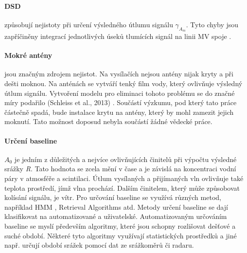 \documentclass[a4paper,12pt,oneside]{report}
\begin{document}
\paragraph*{DSD} způsobují nejistoty při určení výsledného útlumu
signálu \emph{$\gamma_{A_{m}} $}. Tyto chyby jsou zapříčiněny
integrací jednotlivých úseků tlumících signál na linii MV
spoje \cite{mv1}.

\paragraph*{Mokré antény}jsou značným zdrojem nejistot. Na vysílačích
nejsou antény nijak kryty a při dešti moknou. Na anténách se vytváří
tenký film vody, který ovlivňuje výsledný útlum signálu. Vytvoření
modelu pro eliminaci tohoto problému se do značné míry podařilo
(Schleiss et al., 2013) \cite{wetat}. Součástí výzkumu, pod který tato
práce částečně spadá, bude instalace krytu na antény, který by mohl
zamezit jejich moknutí. Tato možnost doposud nebyla součástí žádné
vědecké práce.

\paragraph*{Určení baseline } \emph{$A_{0}$} je jedním z důležitých
a nejvíce ovlivňujících činitelů při výpočtu výsledné srážky
\emph{R}. Tato hodnota se zcela mění v čase a je závislá na
koncentraci vodní páry v atmosféře a scintilaci. Útlum vysílaných a
přijímaných vln ovlivňuje také teplota prostředí, jímž vlna
prochází. Dalším činitelem, který může způsobovat kolísání signálu, je
vítr.  Pro určování baseline se využívá různých metod, například
   \acs{HMM} \cite{comparsinmv}, Retrieval Algorithms
\cite{countryw} atd. Metody určení baseline se dají klasifikovat na
automatizované a uživatelské. Automatizovaným určováním baseline se
myslí především algoritmy, které jsou schopny rozlišovat dešťové a suché
období. Některé tyto algoritmy využívají statistických prostředků a
jiné např. určují období srážek pomocí dat ze srážkoměrů
\cite{countryw} či radaru.
\end{document}
